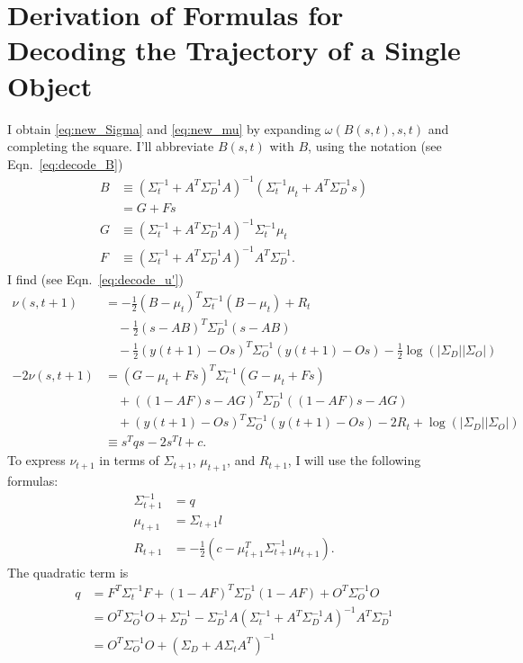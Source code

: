 \documentclass[12pt]{article}
\newcommand{\ti}[2]{{#1}{(#2)}}                         %
\newcommand{\logdet}{\log\left(\left|\Sigma_D\right| \left| \Sigma_O
    \right| \right)}
\begin{document}
\section{Derivation of Formulas for Decoding the Trajectory of a Single Object}
\label{app:decode}

I obtain \eqref{eq:new_Sigma} and \eqref{eq:new_mu} by expanding
$\omega(B(s,t),s,t)$ and completing the square.  I'll abbreviate $B(s,t)$
with $B$, using the notation (see Eqn.~\eqref{eq:decode_B})
\begin{align*}
  B &\equiv \left( \Sigma_t^{-1} + A^T \Sigma_D^{-1} A \right)^{-1}
  \left( \Sigma_t^{-1} \mu_t + A^T \Sigma_D^{-1} s \right) \\
  &= G + Fs \\
  G &\equiv \left( \Sigma_t^{-1} + A^T \Sigma_D^{-1} A \right)^{-1}
  \Sigma_t^{-1} \mu_t \\
  F &\equiv  \left( \Sigma_t^{-1} + A^T \Sigma_D^{-1} A \right)^{-1}
  A^T \Sigma_D^{-1}.
\end{align*}
I find (see Eqn.~\eqref{eq:decode_u'})
\begin{align*}
  \nu(s,t+1) &= -\frac{1}{2}(B-\mu_{t})^T \Sigma_{t}^{-1}
  (B-\mu_{t}) + R_t\\
  &\quad - \frac{1}{2} (s-AB)^T \Sigma_{D}^{-1} (s-AB)\\
  &\quad - \frac{1}{2}(\ti{y}{t+1}-O s)^T \Sigma_{O}^{-1}
  (\ti{y}{t+1}-Os) -\frac{1}{2} \logdet\\
  -2 \nu(s,t+1) &= (G-\mu_{t}+Fs)^T \Sigma_{t}^{-1} (G-\mu_{t}+Fs) \\
  &\quad + ((1-AF)s-AG)^T \Sigma_{D}^{-1} ((1-AF)s-AG)\\
  &\quad + (\ti{y}{t+1}-O s)^T \Sigma_{O}^{-1} (\ti{y}{t+1}-Os) -2R_t + \logdet \\
  &\equiv s^T q s - 2s^T l + c.
\end{align*}
To express $\nu_{t+1}$ in terms of $\Sigma_{t+1}$, $\mu_{t+1}$, and
$R_{t+1}$, I will use the following formulas:
\begin{align*}
  \Sigma_{t+1}^{-1} &= q \\
  \mu_{t+1} &= \Sigma_{t+1} l \\
  R_{t+1} &= -\frac{1}{2} \left( c - \mu_{t+1}^T \Sigma_{t+1}^{-1}
    \mu_{t+1} \right) .
\end{align*}
The quadratic term is
\begin{align*}
  q &= F^T\Sigma_t^{-1}F + (1-AF)^T\Sigma_D^{-1}(1-AF) +
  O^T\Sigma_O^{-1}O \\
  &= O^T\Sigma_O^{-1}O + \Sigma_D^{-1} - \Sigma_D^{-1}A
  ( \Sigma_t^{-1} + A^T\Sigma_D^{-1}A )^{-1}A^T\Sigma_D^{-1}\\
  &= O^T\Sigma_O^{-1}O + (\Sigma_D + A \Sigma_t A^T)^{-1}
\end{align*}
\end{document}
